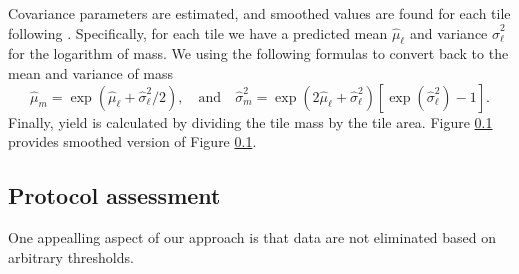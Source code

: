 Covariance parameters are estimated, and smoothed values are found for
each tile following \cite{Cressie1993}.  Specifically, for each tile
we have a predicted mean $\hat\mu_{\ell}$ and variance
$\hat\sigma^2_{\ell}$ for the logarithm of mass.  We using the
following formulas to convert back to the mean and variance of mass
\[ \hat{\mu}_{m} = \exp\left(\hat{\mu}_{\ell} +
\hat{\sigma}^2_{\ell}/2\right), \quad\mbox{and}\quad
\hat{\sigma}^2_{m} = \exp\left(2 \hat{\mu}_{\ell} +
\hat{\sigma}^2_{\ell}\right)
\left[\exp\left(\hat{\sigma}^2_{\ell}\right) - 1\right].
 \] Finally, yield is calculated by dividing the tile mass by the tile
area.  Figure \ref{} provides smoothed version of Figure \ref{}.

\subsection{Protocol assessment}

One appealling aspect of our approach is that data are not eliminated
based on arbitrary thresholds.




